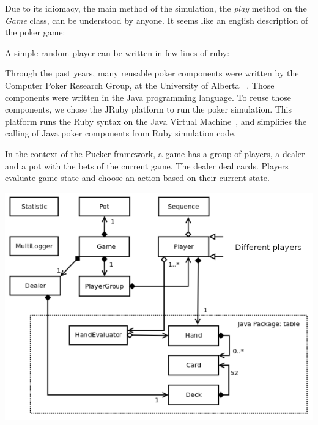 Due to its idiomacy, the main method of the simulation, the \textit{play} method on the \textit{Game} class, can be understood by anyone. It seems like an english description of the poker game:


A simple random player can be written in few lines of ruby:


Through the past years, many reusable poker components were written by the Computer Poker Research Group, at the University of Alberta ~\cite{spaz.ca/poker/doc}. Those components were written in the Java programming language. To reuse those components, we chose the JRuby platform to run the poker simulation. This platform runs the Ruby syntax on the Java Virtual Machine~\cite{jruby.org}, and simplifies the calling of Java poker components from Ruby simulation code.

In the context of the Pucker framework, a game has a group of players, a dealer and a pot with the bets of the current game. The dealer deal cards. Players evaluate game state and choose an action based on their current state.

\vspace{1cm}
\includegraphics[scale=2]{simulation-diagram}

